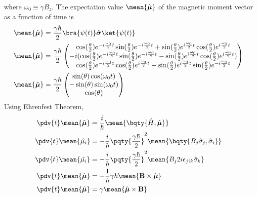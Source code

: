 \documentclass[12pt]{article}
\begin{document}
        where \(\omega_0\equiv \gamma B_z\). The expectation value \(\mean{\hat{\boldsymbol \mu}}\) of the magnetic moment vector as a function of time is \begin{align*}
            \mean{\hat{\boldsymbol \mu}} &= \frac{\gamma\hbar}{2} \bra{\psi(t)} \hat{\boldsymbol \sigma} \ket{\psi(t)}\\
            \mean{\hat{\boldsymbol \mu}} &= \frac{\gamma\hbar}{2} \begin{pmatrix} 
                \cos(\frac{\theta}{2}) e^{ - i\frac{\omega_0}{2}t} \sin(\frac{\theta}{2}) e^{ - i\frac{\omega_0}{2}t} + \sin(\frac{\theta}{2}) e^{i\frac{\omega_0}{2}t}\cos(\frac{\theta}{2}) e^{i\frac{\omega_0}{2}t}  \\
                - i(\cos(\frac{\theta}{2}) e^{ - i\frac{\omega_0}{2}t} \sin(\frac{\theta}{2}) e^{ - i\frac{\omega_0}{2}t} - \sin(\frac{\theta}{2}) e^{i\frac{\omega_0}{2}t}\cos(\frac{\theta}{2}) e^{i\frac{\omega_0}{2}t} ) \\
                \cos(\frac{\theta}{2}) e^{ - i\frac{\omega_0}{2}t} \cos(\frac{\theta}{2}) e^{ i\frac{\omega_0}{2}t} - \sin(\frac{\theta}{2}) e^{i\frac{\omega_0}{2}t}\sin(\frac{\theta}{2}) e^{ -i\frac{\omega_0}{2}t} 
            \end{pmatrix} \\
            \mean{\hat{\boldsymbol \mu}} &= \frac{\gamma\hbar}{2} \begin{pmatrix}
                \sin(\theta)\cos(\omega_0t)\\
                -\sin(\theta)\sin(\omega_0t)\\
                \cos(\theta)
            \end{pmatrix}
        \end{align*}
        Using Ehrenfest Theorem, \begin{align*}
            \pdv{t} \mean{\hat{\boldsymbol \mu}} &= \frac{i}{\hbar} \mean{\bqty{\hat{H}, \hat{\boldsymbol \mu}}}\\
            \pdv{t} \mean{\hat{\mu_i}} &= - \frac{i}{\hbar} \pqty{\frac{\gamma\hbar}{2}}^2\mean{\bqty{B_j \hat{\sigma}_j, \hat{\sigma}_i}}\\
            \pdv{t} \mean{\hat{\mu_i}} &= - \frac{i}{\hbar} \pqty{\frac{\gamma\hbar}{2}}^2 \mean{ B_j  2i\epsilon_{jik} \hat{\sigma}_k}\\
            \pdv{t} \mean{\hat{\boldsymbol \mu}} &= - \frac{1}{\hbar} \gamma\hbar \mean{{\bf B} \times \hat{\boldsymbol \mu}}\\
            \pdv{t} \mean{\hat{\boldsymbol \mu}} &= \gamma \mean{\hat{\boldsymbol \mu} \times \bf B}
        \end{align*}
\end{document}
